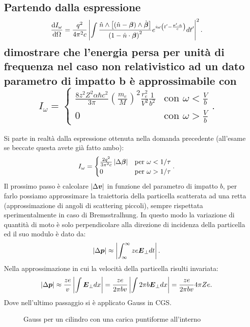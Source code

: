 \subsection[ Energia persa per irraggiamento nell'unità di frequenza non relativistica in funzione di $b$]{Partendo dalla espressione \[ 
	\frac{\mbox{d} I_{\omega}}{\mbox{d} \Omega} = \frac{q^2}{4\pi^2 c}
	\left|\int\frac{\hat{n}\wedge\left[\left(\hat{n}-\boldsymbol{\beta}\right)\wedge\dot{\boldsymbol{\beta}}\right]}{\left(1-\hat{n}\cdot\boldsymbol{\beta}\right)^2}
	e^{i\omega\left(t'-\frac{\boldsymbol{r}'\cdot\hat{n}}{c}\right)}dt'\right|^2.\] 
dimostrare che l’energia persa per unità di frequenza nel caso non relativistico ad un dato parametro di impatto b è approssimabile con
\[
	I_{\omega}=
	\begin{cases}
		\frac{8z^2Z^2\alpha \hbar c^2}{3\pi}\left( \frac{m_e}{M} \right) ^2 \frac{r^2_e}{V^2}\frac{1}{b ^2} & \text{con } \omega< \frac{V}{b}\\
		0 & \text{con } \omega > \frac{V}{b}
	\end{cases}
.\] 
}
\label{sec:4.b.7}
Si parte in realtà dalla espressione ottenuta nella domanda precedente (all'esame se beccate questa avete già fatto ambo):
\[
	I_{\omega}=
	\begin{cases}
		\frac{2q^2}{3\pi^2 c}\left| \Delta \boldsymbol{\beta} \right|  &\text{per } \omega< 1 /\tau\\  
		0 & \text{per } \omega > 1 /\tau
	\end{cases}.
\]
Il prossimo passo è calcolare $\left| \Delta \boldsymbol{v} \right| $ in funzione del parametro di impatto $b$, per farlo possiamo approssimare la traiettoria della particella scatterata ad una retta (approssimazione di angoli di scattering piccoli), sempre rispettata sperimentalmente in caso di Bremsstralhung. In questo modo la variazione di quantità di moto è solo perpendicolare alla direzione di incidenza della particella ed il suo modulo è dato da:
\[
	\left| \Delta \boldsymbol{p} \right| \approx \left| \int_{\infty}^{\infty} ze \boldsymbol{E}_{\bot} dt \right| 
.\] 
Nella approssimazione in cui la velocità della particella risulti invariata:
\[
	\left| \Delta \boldsymbol{p} \right| \approx \frac{ze}{v} \left| \int \boldsymbol{E}_{\bot} dx\right|= 
	\frac{ze}{2\pi b v} \left| \int 2\pi b \boldsymbol{E}_{\bot}dx \right|= \frac{ze}{2\pi b v } 4\pi Ze
.\] 
Dove nell'ultimo passaggio si è applicato Gauss in CGS.\\
\begin{figure}[H]
    \centering
    \caption{Gauss per un cilindro con una carica puntiforme all'interno}
    \label{fig:gauss-per-un-cilindro-con-una-carica-puntiforme-all'interno}
\end{figure}

